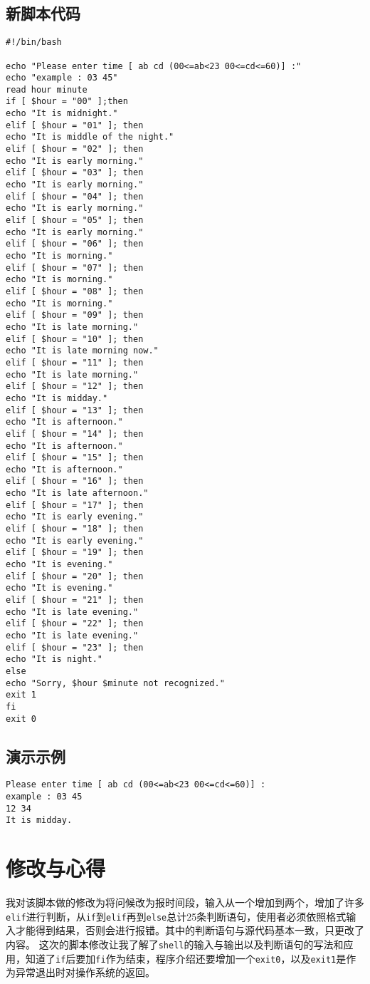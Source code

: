 \documentclass{ctexart}
\begin{document}
\subsection{新脚本代码}
\begin{verbatim}
#!/bin/bash

echo "Please enter time [ ab cd (00<=ab<23 00<=cd<=60)] :"
echo "example : 03 45"
read hour minute
if [ $hour = "00" ];then
echo "It is midnight."
elif [ $hour = "01" ]; then
echo "It is middle of the night."
elif [ $hour = "02" ]; then
echo "It is early morning."
elif [ $hour = "03" ]; then
echo "It is early morning."
elif [ $hour = "04" ]; then
echo "It is early morning."
elif [ $hour = "05" ]; then
echo "It is early morning."
elif [ $hour = "06" ]; then
echo "It is morning."
elif [ $hour = "07" ]; then
echo "It is morning."
elif [ $hour = "08" ]; then
echo "It is morning."
elif [ $hour = "09" ]; then
echo "It is late morning."
elif [ $hour = "10" ]; then
echo "It is late morning now."
elif [ $hour = "11" ]; then
echo "It is late morning."
elif [ $hour = "12" ]; then
echo "It is midday."
elif [ $hour = "13" ]; then
echo "It is afternoon."
elif [ $hour = "14" ]; then
echo "It is afternoon."
elif [ $hour = "15" ]; then
echo "It is afternoon."
elif [ $hour = "16" ]; then
echo "It is late afternoon."
elif [ $hour = "17" ]; then
echo "It is early evening."
elif [ $hour = "18" ]; then
echo "It is early evening."
elif [ $hour = "19" ]; then
echo "It is evening."
elif [ $hour = "20" ]; then
echo "It is evening."
elif [ $hour = "21" ]; then
echo "It is late evening."
elif [ $hour = "22" ]; then
echo "It is late evening."
elif [ $hour = "23" ]; then
echo "It is night."
else
echo "Sorry, $hour $minute not recognized."
exit 1
fi
exit 0
\end{verbatim}

\subsection{演示示例}
\begin{verbatim}
Please enter time [ ab cd (00<=ab<23 00<=cd<=60)] :
example : 03 45
12 34
It is midday.
\end{verbatim}

\section{修改与心得}
\begin{flushleft}
我对该脚本做的修改为将问候改为报时间段，输入从一个增加到两个，增加了许多\verb|elif|进行判断，从\verb|if|到\verb|elif|再到\verb|else|总计25条判断语句，使用者必须依照格式输入才能得到结果，否则会进行报错。其中的判断语句与源代码基本一致，只更改了内容。
这次的脚本修改让我了解了\verb|shell|的输入与输出以及判断语句的写法和应用，知道了\verb|if|后要加\verb|fi|作为结束，程序介绍还要增加一个\verb|exit0|，以及\verb|exit1|是作为异常退出时对操作系统的返回。
\end{flushleft}
\end{document}
